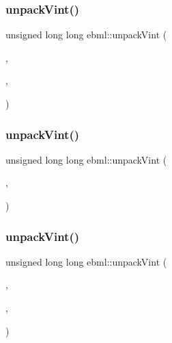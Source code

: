 \mbox{\label{namespaceebml_a28d35d96aa75eadb27676a59d6972506}} 
\subsubsection{\texorpdfstring{unpack\+Vint()}{unpackVint()}\hspace{0.1cm}{\footnotesize\ttfamily [2/4]}}
{\footnotesize\ttfamily unsigned long long ebml\+::unpack\+Vint (\begin{DoxyParamCaption}\item[{const char $\ast$}]{,  }\item[{size\+\_\+t}]{,  }\item[{\mbox{\hyperlink{namespaceebml_a2ccdfb60b23efb51fe07f9d066e23604}{vint\+Width\+\_\+t}} \&}]{ }\end{DoxyParamCaption})}

\mbox{\label{namespaceebml_aa37686e968c0b4654851623ecd21bf0a}} 
\subsubsection{\texorpdfstring{unpack\+Vint()}{unpackVint()}\hspace{0.1cm}{\footnotesize\ttfamily [3/4]}}
{\footnotesize\ttfamily unsigned long long ebml\+::unpack\+Vint (\begin{DoxyParamCaption}\item[{\mbox{\hyperlink{classebml_1_1ioBase}{io\+Base}} $\ast$}]{,  }\item[{\mbox{\hyperlink{namespaceebml_a2ccdfb60b23efb51fe07f9d066e23604}{vint\+Width\+\_\+t}} \&}]{ }\end{DoxyParamCaption})}

\mbox{\label{namespaceebml_a897f00b5febf5789f251984ec046b8bf}} 
\subsubsection{\texorpdfstring{unpack\+Vint()}{unpackVint()}\hspace{0.1cm}{\footnotesize\ttfamily [4/4]}}
{\footnotesize\ttfamily unsigned long long ebml\+::unpack\+Vint (\begin{DoxyParamCaption}\item[{\mbox{\hyperlink{classebml_1_1ioBase}{io\+Base}} $\ast$}]{,  }\item[{off\+\_\+t}]{,  }\item[{\mbox{\hyperlink{namespaceebml_a2ccdfb60b23efb51fe07f9d066e23604}{vint\+Width\+\_\+t}} \&}]{ }\end{DoxyParamCaption})}

